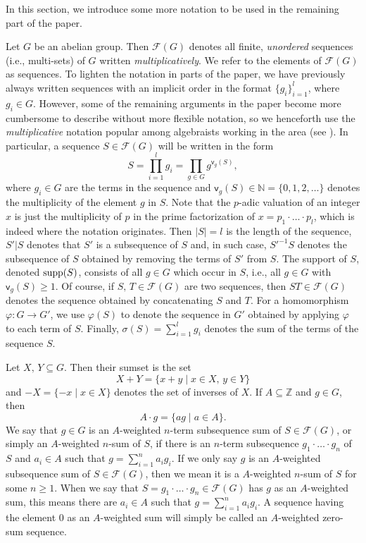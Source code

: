 \documentclass[11pt,reqno]{amsart}
\numberwithin{equation}{section}
\theoremstyle{definition}
\numberwithin{equation}{section}
\begin{document}
In this section, we introduce some more notation to be used in the
remaining part of the paper.

Let $G$ be an abelian group. Then ${\mathcal F}(G)$ denotes all  finite, {\it unordered }
sequences (i.e., multi-sets) of $G$ written {\it multiplicatively}.
 We refer to the elements of ${\mathcal F}(G)$ as sequences. To lighten the
notation in parts of the paper, we have previously always written sequences with an implicit
order in the format $\{g_i\}_{i=1}^l$, where $g_i\in
G$. However, some of the remaining arguments in
 the paper become more cumbersome to describe without more flexible
notation, so we henceforth use the
{\it multiplicative}
 notation popular among algebraists working in the area (see \cite{Alfred-book} \cite{GG}). In
 particular, a sequence $S\in {\mathcal F}(G)$ will be written in the form
 $$S=\prod_{i=1}^{l}g_i=\prod_{g\in G}g^{{\mathsf v}_g(S)},$$ where $g_i\in G$ are
 the terms in the sequence and  ${\mathsf v}_g(S)\in {\mathbb N}=\{0,1,2,\ldots\}$ denotes
 the multiplicity of the element $g$ in $S$. Note that the $p$-adic valuation of an integer $x$
 is just the multiplicity of $p$ in the prime factorization of $x=p_1\cdot\ldots\cdot p_l$,
 which is indeed where the notation originates.
 Then $|S|=l$ is the length of
 the sequence, $S'|S$ denotes that $S'$ is a subsequence of $S$ and, in
 such case, ${S'}^{-1}S$ denotes the subsequence of $S$ obtained by
 removing the terms of $S'$ from $S$. The support of $S$, denoted
 ${\text{\rm supp}}(S)$, consists of all $g\in G$ which occur in $S$, i.e., all $g\in
 G$ with ${\mathsf v}_g(S)\geq 1$. Of course, if $S,\,T\in {\mathcal F}(G)$ are two
 sequences, then $ST\in {\mathcal F}(G)$ denotes the sequence obtained by
 concatenating $S$ and $T$. For a homomorphism $\varphi:G\rightarrow G'$,
 we use $\varphi(S)$ to denote the sequence in $G'$ obtained by applying
 $\varphi$ to each term of $S$. Finally, $\sigma(S)={\sum_{{i=1}}^{{l}}}g_i$
 denotes the sum of the terms of the sequence $S$.

 Let $X,\,Y\subseteq G$. Then their sumset is the set $$X+Y=\{x+y\mid x\in
 X,\,y\in Y\}$$ and $-X=\{-x\mid x\in X\}$ denotes the set of inverses of
 $X$. If $A\subseteq {\mathbb Z}$ and $g\in G$, then $$A\cdot g=\{ag\mid a\in
 A\}.$$ We say that $g\in G$ is an $A$-weighted $n$-term subsequence sum
 of $S\in {\mathcal F}(G)$, or simply an $A$-weighted $n$-sum of $S$,  if there is
 an $n$-term subsequence $g_1\cdot\ldots\cdot g_n$ of $S$ and $a_i\in A$
 such that $g={\sum_{{i=1}}^{{n}}}a_ig_i$. If we only say $g$ is an $A$-weighted
 subsequence sum of $S\in {\mathcal F}(G)$, then we mean it is a $A$-weighted
 $n$-sum of $S$ for some $n\geq 1$. When we say that
 $S=g_1\cdot\ldots\cdot g_n\in {\mathcal F}(G)$ has $g$ as an $A$-weighted sum,
this means there are $a_i\in A$ such that $g={\sum_{{i=1}}^{{n}}}a_ig_i$. A
 sequence having the element $0$ as an $A$-weighted sum will simply be
called  an $A$-weighted zero-sum sequence.
\end{document}
